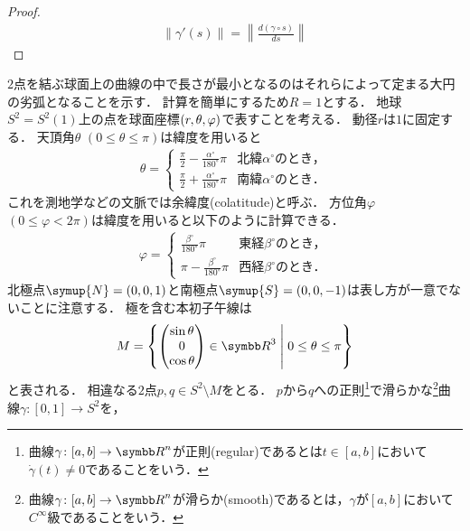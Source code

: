 \documentclass{ltjsbook}
\begin{document}
\begin{proof}
\begin{align*}
    \lVert \gamma'(s) \rVert = \left\lVert \frac{d(\gamma \circ s)}{ds} \right\rVert
\end{align*}
\end{proof}

\(2\)点を結ぶ球面上の曲線の中で長さが最小となるのはそれらによって定まる大円の劣弧となることを示す．
計算を簡単にするため\(R = 1\)とする．
地球\(S^2 = S^2(1)\)上の点を球面座標\((r, \theta, \varphi)\)で表すことを考える．
動径\(r\)は\(1\)に固定する．
天頂角\(\theta\) \((0 \leq \theta \leq \pi)\)は緯度を用いると
\begin{align*}
    \theta = \begin{cases}
        \displaystyle
        \frac{\pi}{2} - \frac{\alpha^\circ}{180^\circ} \pi
        & \text{北緯\(\alpha^\circ\)のとき，} \\[10pt]
        \displaystyle
        \frac{\pi}{2} + \frac{\alpha^\circ}{180^\circ} \pi
        & \text{南緯\(\alpha^\circ\)のとき．}
    \end{cases}
\end{align*}
これを測地学などの文脈では余緯度(colatitude)と呼ぶ．
方位角\(\varphi\) \((0 \leq \varphi < 2\pi)\)は緯度を用いると以下のように計算できる．
\begin{align*}
    \varphi = \begin{cases}
        \displaystyle
        \frac{\beta^\circ}{180^\circ} \pi
        & \text{東経\(\beta^\circ\)のとき，} \\[10pt]
        \displaystyle
        \pi - \frac{\beta^\circ}{180^\circ} \pi
        & \text{西経\(\beta^\circ\)のとき．}
    \end{cases}
\end{align*}
北極点\(\symup{N} = (0, 0, 1)\)と南極点\(\symup{S} = (0, 0, -1)\)は表し方が一意でないことに注意する．
極を含む本初子午線は
\begin{align*}
    M = \left\{\begin{pmatrix} \sin \theta \\ 0 \\ \cos \theta \end{pmatrix} \in {\Real}^3 \relmiddle{|} 0 \leq \theta \leq \pi\right\}
\end{align*}
と表される．
相違なる\(2\)点\(p, q \in S^2 \setminus M\)をとる．
\(p\)から\(q\)への正則\footnote{%
曲線\(\gamma\colon [a, b] \to {\Real}^n\)が正則(regular)であるとは\(t \in [a, b]\)において\(\dot{\gamma}(t) \neq 0\)であることをいう．
}で滑らかな\footnote{%
曲線\(\gamma\colon [a, b] \to {\Real}^n\)が滑らか(smooth)であるとは，\(\gamma\)が\([a, b]\)において\(C^\infty\)級であることをいう．
}曲線\(\gamma \colon [0, 1] \to S^2\)を，
\end{document}
